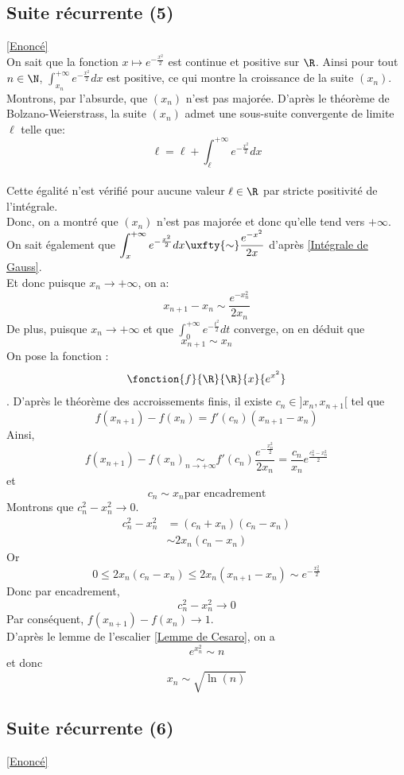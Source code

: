 \documentclass{book}
\begin{document}
	\subsection{Suite récurrente (5)}\label{sec:suite-recurrente-5}
	\textcolor{blue}{\hyperref[Suite récurrente 5]{[Enoncé]}}\\
	On sait que la fonction $x\mapsto e^{-\frac{x^2}{2}}$ est continue et positive sur $\R$. Ainsi pour tout $n\in\N$, $\displaystyle\int_{x_n}^{+\infty}e^{-\frac{x^2}{2}}dx$ est positive, ce qui montre la croissance de la suite $(x_n)$.
	Montrons, par l'absurde, que $(x_n)$ n'est pas majorée.
	D'après le théorème de Bolzano-Weierstrass, la suite $(x_n)$ admet une sous-suite convergente de limite $\ell$ telle que:$$\ell=\ell+\int_\ell^{+\infty}e^{-\frac{x^2}{2}}dx$$
	\\Cette égalité n'est vérifié pour aucune valeur $\ell\in\R$ par stricte positivité de l'intégrale.
	\\Donc, on a montré que $(x_n)$ n'est pas majorée et donc qu'elle tend vers $+\infty$.
	\\On sait également que $\displaystyle\int_x^{+\infty}e^{-\frac{x^2}{2}}dx\uxfty{\sim}\frac{e^{-x^2}}{2x}$ d'après \ref{Intégrale de Gauss}.
	\\Et donc puisque $x_n\to+\infty$, on a: $$x_{n+1}-x_n\sim\frac{e^{-x_n^2}}{2x_n}$$
	De plus, puisque $x_n\to +\infty$ et que $\int_{0}^{+\infty}e^{-\frac{t^2}{2}}dt$ converge, on en déduit que \[x_{n+1}\sim x_n\]
	On pose la fonction : \[\fonction{f}{\R}{\R}{x}{e^{x^2}}\].
	D'après le théorème des accroissements finis, il existe $c_n\in]x_n, x_{n+1}[$ tel que \[f(x_{n+1})-f(x_n)=f'(c_n)(x_{n+1}-x_n)\]
	Ainsi, \[f(x_{n+1})-f(x_n)\underset{n\to+\infty}{\sim}f'(c_n)\frac{e^{-\frac{x_n^2}{2}}}{2x_n}=\frac{c_n}{x_n}e^{\frac{c_n^2-x_n^2}{2}}\]
	et \[c_n\sim x_n \text{par encadrement}\]
	Montrons que $c_n^2-x_n^2\to 0$.\\
	\begin{align*}
		c_n^2-x_n^2&=(c_n+x_n)(c_n-x_n)\\
		&\sim 2x_n(c_n-x_n)
	\end{align*}
	Or \[0\leq 2x_n(c_n-x_n)\leq 2x_n(x_{n+1}-x_n)\sim e^{-\frac{x_n^2}{2}}\]
	Donc par encadrement, \[c_n^2-x_n^2\to 0\]
	Par conséquent, $f(x_{n+1})-f(x_n)\to 1$.\\
	D'après le lemme de l'escalier \ref{Lemme de Cesaro}, on a \[e^{x_n^2}\sim n\]
	et donc \[x_n\sim\sqrt{\ln(n)}\]
	
	\subsection{Suite récurrente (6)}\label{sec:suite-recurrente-6}
	\textcolor{blue}{\hyperref[Suite récurrente 6]{[Enoncé]}}\\
	
\end{document}
